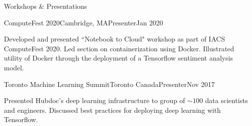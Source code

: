 \documentclass{resume} %
\begin{document}
\begin{rSection}{Workshops \& Presentations}

\begin{rSubsection}{ComputeFest 2020}{Cambridge, MA}{Presenter}{Jan 2020}

\item Developed and presented ``Notebook to Cloud" workshop as part of IACS ComputeFest 2020. Led section on containerization using Docker. Illustrated utility of Docker through the deployment of a Tensorflow sentiment analysis model.

\end{rSubsection}

\begin{rSubsection}{Toronto Machine Learning Summit}{Toronto Canada}{Presenter}{Nov 2017}

\item Presented Hubdoc's deep learning infrastructure to group of $\sim 100$ data scientists and engineers. Discussed best practices for deploying deep learning with Tensorflow. 

\end{rSubsection}

\end{rSection}
\end{document}
